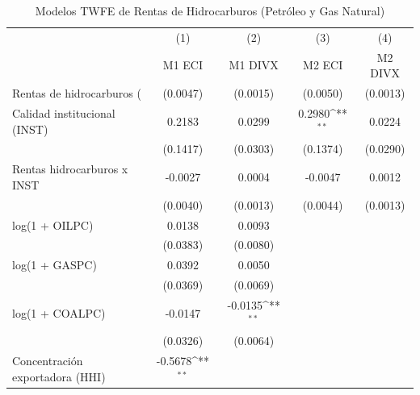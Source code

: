 \begin{table}[htbp]\centering
\def\sym#1{\ifmmode^{#1}\else\(^{#1}\)\fi}
\caption{Modelos TWFE de Rentas de Hidrocarburos (Petróleo y Gas Natural)}
\begin{tabular}{l*{4}{c}}
\toprule
                    &\multicolumn{1}{c}{(1)}&\multicolumn{1}{c}{(2)}&\multicolumn{1}{c}{(3)}&\multicolumn{1}{c}{(4)}\\
                    &\multicolumn{1}{c}{M1 ECI}&\multicolumn{1}{c}{M1 DIVX}&\multicolumn{1}{c}{M2 ECI}&\multicolumn{1}{c}{M2 DIVX}\\
\midrule
Rentas de hidrocarburos (%
                    &    (0.0047)         &    (0.0015)         &    (0.0050)         &    (0.0013)         \\
\addlinespace
Calidad institucional (INST)&      0.2183         &      0.0299         &      0.2980\sym{**} &      0.0224         \\
                    &    (0.1417)         &    (0.0303)         &    (0.1374)         &    (0.0290)         \\
\addlinespace
Rentas hidrocarburos x INST&     -0.0027         &      0.0004         &     -0.0047         &      0.0012         \\
                    &    (0.0040)         &    (0.0013)         &    (0.0044)         &    (0.0013)         \\
\addlinespace
log(1 + OILPC)      &      0.0138         &      0.0093         &                     &                     \\
                    &    (0.0383)         &    (0.0080)         &                     &                     \\
\addlinespace
log(1 + GASPC)      &      0.0392         &      0.0050         &                     &                     \\
                    &    (0.0369)         &    (0.0069)         &                     &                     \\
\addlinespace
log(1 + COALPC)     &     -0.0147         &     -0.0135\sym{**} &                     &                     \\
                    &    (0.0326)         &    (0.0064)         &                     &                     \\
\addlinespace
Concentración exportadora (HHI)&     -0.5678\sym{**} &                     &                     &                     \\

\end{tabular}
\end{table}
